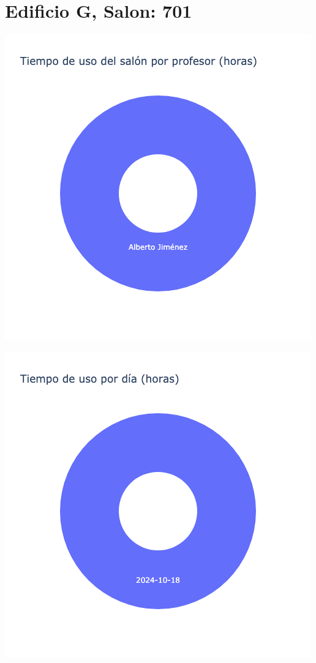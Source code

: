 \documentclass{article}
\begin{document}
    \section{Edificio G, Salon: 701}
    \noindent
    \begin{minipage}{0.48\textwidth}
        \centering
        \includegraphics[width=\textwidth]{../img/pie/UP701-90Dias-03-12-2024.png}
    \end{minipage}
    \hfill
    \begin{minipage}{0.48\textwidth}
        \centering
        \includegraphics[width=\textwidth]{../img/pie/UD701-90Dias-03-12-2024.png}
    \end{minipage}
    
\end{document}
